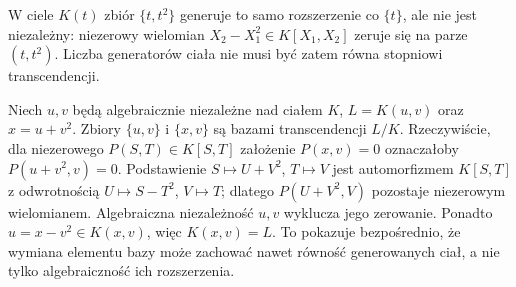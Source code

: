 \begin{przyklad}
\label{aa:prz:transcendence-dependent}
W ciele $K(t)$ zbiór $\{t,t^2\}$ generuje to samo
rozszerzenie co $\{t\}$, ale nie jest niezależny:
niezerowy wielomian $X_2-X_1^2\in K[X_1,X_2]$
zeruje się na parze $(t,t^2)$.
Liczba generatorów ciała nie musi być zatem równa
stopniowi transcendencji.
\end{przyklad}


\begin{przyklad}
\label{aa:prz:transcendence-exchange-explicit}
Niech $u,v$ będą algebraicznie niezależne nad ciałem $K$,
$L=K(u,v)$ oraz $x=u+v^2$. Zbiory $\{u,v\}$ i
$\{x,v\}$ są bazami transcendencji $L/K$.
Rzeczywiście, dla niezerowego $P(S,T)\in K[S,T]$
założenie $P(x,v)=0$ oznaczałoby
$P(u+v^2,v)=0$. Podstawienie $S\mapsto U+V^2$,
$T\mapsto V$ jest automorfizmem $K[S,T]$ z odwrotnością
$U\mapsto S-T^2$, $V\mapsto T$; dlatego
$P(U+V^2,V)$ pozostaje niezerowym wielomianem.
Algebraiczna niezależność $u,v$ wyklucza jego zerowanie.
Ponadto $u=x-v^2\in K(x,v)$, więc $K(x,v)=L$.
To pokazuje bezpośrednio, że wymiana elementu bazy
może zachować nawet równość generowanych ciał,
a nie tylko algebraiczność ich rozszerzenia.
\end{przyklad}
